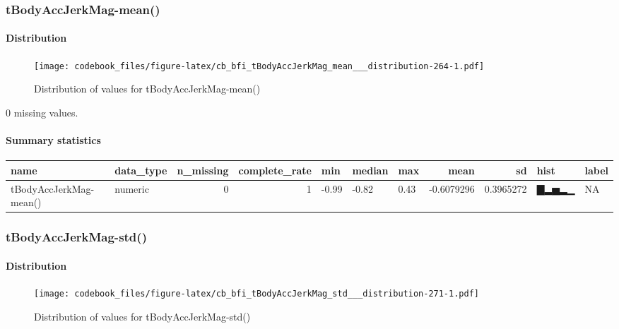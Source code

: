 \documentclass[
]{article}
\begin{document}
\hypertarget{tBodyAccJerkMag_mean__}{%
\subsubsection{tBodyAccJerkMag-mean()}\label{tBodyAccJerkMag_mean__}}

\hypertarget{tBodyAccJerkMag_mean___distribution}{%
\paragraph{Distribution}\label{tBodyAccJerkMag_mean___distribution}}

\begin{figure}
\centering
\texttt{[image: codebook\_files/figure-latex/cb\_bfi\_tBodyAccJerkMag\_mean\_\_\_distribution-264-1.pdf]}
\caption{Distribution of values for tBodyAccJerkMag-mean()}
\end{figure}

0 missing values.

\hypertarget{tBodyAccJerkMag_mean___summary}{%
\paragraph{Summary statistics}\label{tBodyAccJerkMag_mean___summary}}

\begin{longtable}[]{@{}llrrlllrrll@{}}
\toprule
name & data\_type & n\_missing & complete\_rate & min & median & max &
mean & sd & hist & label \\
\midrule
\endhead
tBodyAccJerkMag-mean() & numeric & 0 & 1 & -0.99 & -0.82 & 0.43 &
-0.6079296 & 0.3965272 & ▇▂▅▂▁ & NA \\
\bottomrule
\end{longtable}

\hypertarget{tBodyAccJerkMag_std__}{%
\subsubsection{tBodyAccJerkMag-std()}\label{tBodyAccJerkMag_std__}}

\hypertarget{tBodyAccJerkMag_std___distribution}{%
\paragraph{Distribution}\label{tBodyAccJerkMag_std___distribution}}

\begin{figure}
\centering
\texttt{[image: codebook\_files/figure-latex/cb\_bfi\_tBodyAccJerkMag\_std\_\_\_distribution-271-1.pdf]}
\caption{Distribution of values for tBodyAccJerkMag-std()}
\end{figure}
\end{document}
